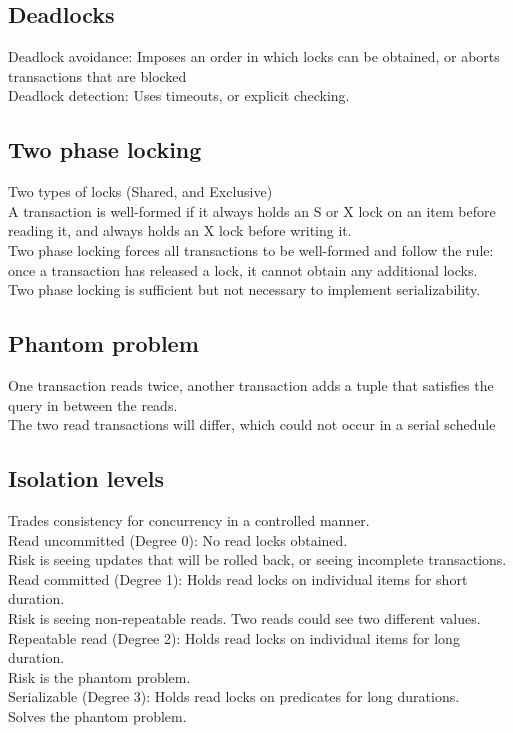 \subsection{Deadlocks}
Deadlock avoidance: Imposes an order in which locks can be obtained, or aborts transactions that are blocked\\
Deadlock detection: Uses timeouts, or explicit checking.\\
\subsection{Two phase locking}
Two types of locks (Shared, and Exclusive)\\
A transaction is well-formed if it always holds an S or X lock on an item before reading it, and always holds an X lock before writing it.\\
Two phase locking forces all transactions to be well-formed and follow the rule: once a transaction has released a lock, it cannot obtain any additional locks.\\
Two phase locking is sufficient but not necessary to implement serializability.
\subsection{Phantom problem}
One transaction reads twice, another transaction adds a tuple that satisfies the query in between the reads. \\
The two read transactions will differ, which could not occur in a serial schedule
\subsection{Isolation levels}
Trades consistency for concurrency in a controlled manner.\\
Read uncommitted (Degree 0): No read locks obtained. \\
Risk is seeing updates that will be rolled back, or seeing incomplete transactions.\\
Read committed (Degree 1): Holds read locks on individual items for short duration. \\
Risk is seeing non-repeatable reads. Two reads could see two different values. \\
Repeatable read (Degree 2): Holds read locks on individual items for long duration. \\
Risk is the phantom problem.\\
Serializable (Degree 3): Holds read locks on predicates for long durations.\\
Solves the phantom problem.
